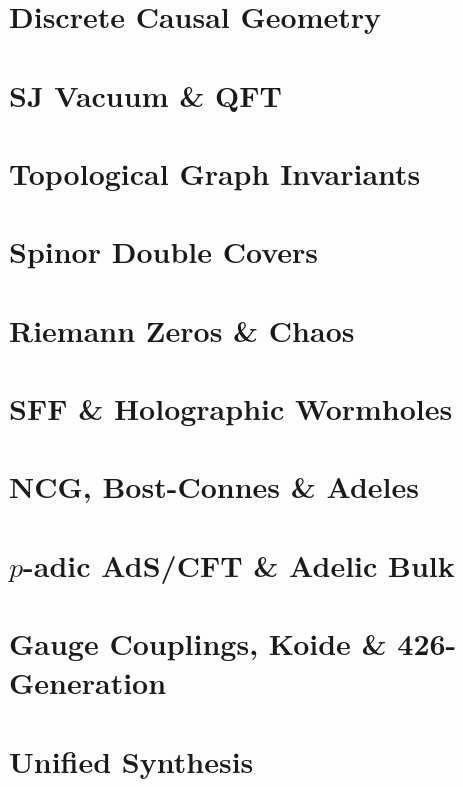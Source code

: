 \documentclass[11pt,a4paper]{book}
\begin{document}
\chapter{Discrete Causal Geometry}


\chapter{SJ Vacuum \& QFT}


\chapter{Topological Graph Invariants}


\chapter{Spinor Double Covers}


\chapter{Riemann Zeros \& Chaos}


\chapter{SFF \& Holographic Wormholes}


\chapter{NCG, Bost-Connes \& Adeles}


\chapter{$p$-adic AdS/CFT \& Adelic Bulk}


\chapter{Gauge Couplings, Koide \& 426-Generation}


\chapter{Unified Synthesis}

\end{document}

